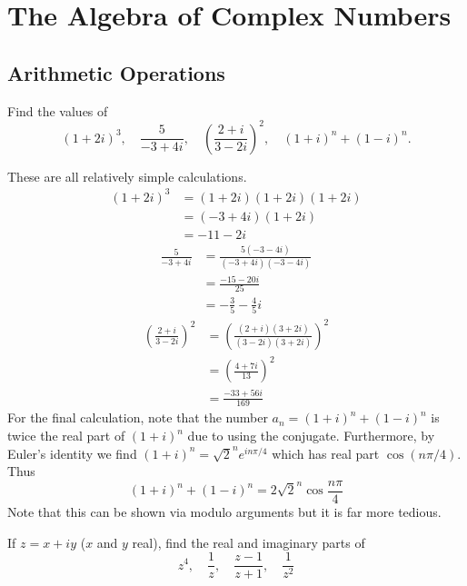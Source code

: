 \documentclass[../../master.tex]{subfiles}
\begin{document}
\section{The Algebra of Complex Numbers}
\subsection{Arithmetic Operations}

\begin{problem}
    Find the values of
    \[
        (1 + 2i)^{3}, \quad \frac{5}{-3 + 4i}, \quad \left(\frac{2 + i}{3 - 2i}\right)^{2}, \quad (1 + i)^{n} + (1 - i)^{n}.
    \]
\end{problem}

\begin{solution}
    These are all relatively simple calculations.
    \begin{align*}
        (1 + 2i)^3 &= (1 + 2i)(1 + 2i)(1 + 2i) \\
                  &= (-3 + 4i)(1 + 2i) \\
                  &= -11 - 2i
    \end{align*}
    \begin{align*}
        \frac{5}{-3 + 4i} &= \frac{5(-3 - 4i)}{(-3 + 4i)(-3 - 4i)} \\
                          &= \frac{-15 - 20i}{25} \\
                          &= -\frac{3}{5} - \frac{4}{5}i
    \end{align*}
    \begin{align*}
        \left(\frac{2+i}{3 - 2i}\right)^2 &= \left(\frac{(2+i)(3+2i)}{(3-2i)(3+2i)}\right)^2 \\
                              &= \left(\frac{4 + 7i}{13}\right)^2 \\
                              &= \frac{-33 + 56i}{169}
    \end{align*}
    For the final calculation, note that the number $a_n = (1 + i)^{n} + (1 - i)^{n}$ is twice the real part of $(1 + i)^{n}$ due to using the conjugate.
    Furthermore, by Euler's identity we find $(1 + i)^{n} = \sqrt{2}^{n} e^{in\pi/4}$ which has real part $\cos(n\pi/4)$. Thus
    \[
        (1 + i)^{n} + (1 - i)^{n} = 2\sqrt{2}^{n} \cos\frac{n\pi}{4}
    \]
    Note that this can be shown via modulo arguments but it is far more tedious.
\end{solution}

\begin{problem}
    If $z = x + iy$ ($x$ and $y$ real), find the real and imaginary parts of
    \[
        z^4, \quad \frac{1}{z}, \quad \frac{z -1}{z + 1}, \quad \frac{1}{z^2}
    \]
\end{problem}
\end{document}
